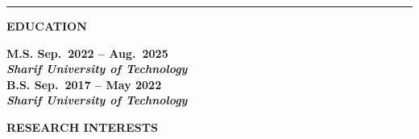 \documentclass[12pt]{article}
\begin{document}

	\noindent\rule[0.5ex]{\linewidth}{.5pt}

\begin{center} %
	{\noindent \bfseries EDUCATION}
\end{center} %

 \vspace{-4pt} %

\noindent
 \bf{M.S.}
  \hfill Sep.\ 2022 -- Aug.\ 2025 \\
\noindent \textit{Sharif University of Technology} \\

\noindent
 \bf{B.S.}
 \hfill Sep.\ 2017 -- May 2022 \\
\noindent \textit{Sharif University of Technology} \\







\vspace{-8pt}
\begin{center}
	{\noindent \bfseries RESEARCH INTERESTS}
\end{center}
\end{document}
